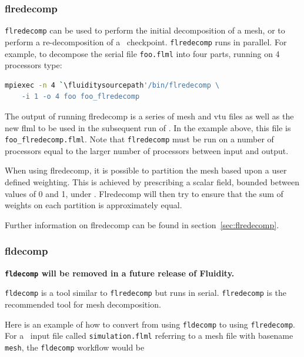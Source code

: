 \subsubsection{flredecomp}
\label{mesh!meshing tools!flredecomp}
\lstinline[language=bash]+flredecomp+ can be used to perform the initial decomposition of a mesh, or to perform a re-decomposition of a \fluidity\ checkpoint. \lstinline[language=bash]+flredecomp+ runs in parallel. 
For example, to decompose the serial file \lstinline+foo.flml+
into four parts, running on 4 processors type:

\begin{lstlisting}[language=bash]
mpiexec -n 4 `\fluiditysourcepath'/bin/flredecomp \
    -i 1 -o 4 foo foo_flredecomp
\end{lstlisting}

The output of running flredecomp is a series of mesh and vtu files as well
as the new flml to be used in the subsequent run of \fluidity.  In the example above, this file is \lstinline+foo_flredecomp.flml+. 
Note that \lstinline[language=bash]+flredecomp+ must be run on a number of processors equal to the larger number of processors between input and output.

When using flredecomp, it is possible to partition the mesh based upon a user defined weighting. 
This is achieved by prescribing a scalar field, bounded between values of 0 and 1, under 
\option{/flredecomp/field\_weighted\_partitions}. Flredecomp will then try to ensure that the sum 
of weights on each partition is approximately equal.

Further information on flredecomp can be found in section~\ref{sec:flredecomp}.

\subsubsection{fldecomp}
\label{mesh!meshing tools!fldecomp}

{\bf \lstinline[language=bash]+fldecomp+ will be removed in a future release of Fluidity.}

\lstinline[language=bash]+fldecomp+ is a tool similar to \lstinline[language=bash]+flredecomp+ but runs in serial. \lstinline[language=bash]+flredecomp+ is the recommended tool for mesh decomposition.

Here is an example of how to convert from using \lstinline[language=bash]+fldecomp+ to using \lstinline[language=bash]+flredecomp+.  For a \fluidity\ input file called \lstinline[language=bash]+simulation.flml+ referring to a mesh file with basename \lstinline[language=bash]+mesh+, the \lstinline[language=bash]+fldecomp+ workflow would be

